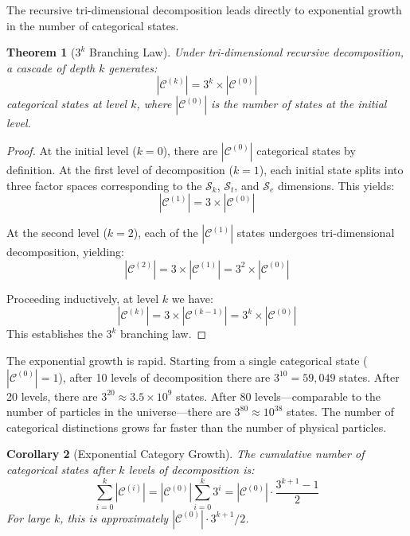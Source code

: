 \documentclass[12pt,a4paper]{article}
\newtheorem{theorem}{Theorem}[section]
\newtheorem{corollary}[theorem]{Corollary}
\theoremstyle{definition}
\theoremstyle{remark}
\newcommand{\Sentropy}{\mathcal{S}}
\begin{document}
The recursive tri-dimensional decomposition leads directly to exponential growth in the number of categorical states.

\begin{theorem}[$3^k$ Branching Law]
\label{thm:3k_branching}
Under tri-dimensional recursive decomposition, a cascade of depth $k$ generates:
\begin{equation}
|\mathcal{C}^{(k)}| = 3^k \times |\mathcal{C}^{(0)}|
\end{equation}
categorical states at level $k$, where $|\mathcal{C}^{(0)}|$ is the number of states at the initial level.
\end{theorem}

\begin{proof}
At the initial level ($k = 0$), there are $|\mathcal{C}^{(0)}|$ categorical states by definition. At the first level of decomposition ($k = 1$), each initial state splits into three factor spaces corresponding to the $\Sentropy_k$, $\Sentropy_t$, and $\Sentropy_e$ dimensions. This yields:
\begin{equation}
|\mathcal{C}^{(1)}| = 3 \times |\mathcal{C}^{(0)}|
\end{equation}

At the second level ($k = 2$), each of the $|\mathcal{C}^{(1)}|$ states undergoes tri-dimensional decomposition, yielding:
\begin{equation}
|\mathcal{C}^{(2)}| = 3 \times |\mathcal{C}^{(1)}| = 3^2 \times |\mathcal{C}^{(0)}|
\end{equation}

Proceeding inductively, at level $k$ we have:
\begin{equation}
|\mathcal{C}^{(k)}| = 3 \times |\mathcal{C}^{(k-1)}| = 3^k \times |\mathcal{C}^{(0)}|
\end{equation}
This establishes the $3^k$ branching law.
\end{proof}

The exponential growth is rapid. Starting from a single categorical state ($|\mathcal{C}^{(0)}| = 1$), after 10 levels of decomposition there are $3^{10} = 59{,}049$ states. After 20 levels, there are $3^{20} \approx 3.5 \times 10^9$ states. After 80 levels—comparable to the number of particles in the universe—there are $3^{80} \approx 10^{38}$ states. The number of categorical distinctions grows far faster than the number of physical particles.

\begin{corollary}[Exponential Category Growth]
\label{cor:exponential_growth}
The cumulative number of categorical states after $k$ levels of decomposition is:
\begin{equation}
\sum_{i=0}^{k} |\mathcal{C}^{(i)}| = |\mathcal{C}^{(0)}| \sum_{i=0}^{k} 3^i = |\mathcal{C}^{(0)}| \cdot \frac{3^{k+1} - 1}{2}
\end{equation}
For large $k$, this is approximately $|\mathcal{C}^{(0)}| \cdot 3^{k+1}/2$.
\end{corollary}
\end{document}
